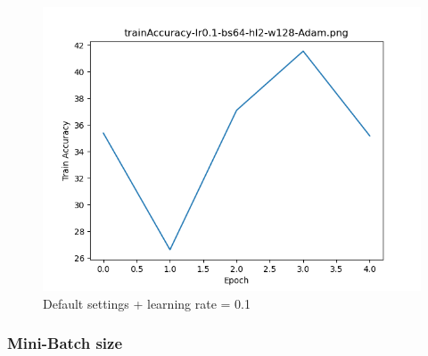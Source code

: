\documentclass{article}[12pt]
\begin{document}
        \begin{figure}[H]
        \includegraphics[width=\linewidth]{testsResults/trainAccuracy/trainAccuracy-lr0.1-bs64-hl2-w128-Adam.png}
        \caption{Default settings + learning rate = 0.1}
        \endminipage
    \end{figure}

\subsubsection{Mini-Batch size}
\end{document}
